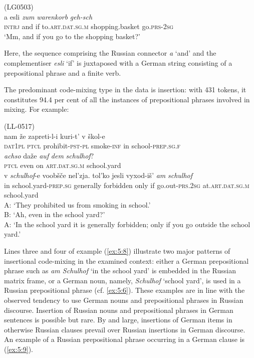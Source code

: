 \ea
\label{ex:5:7}
(LG0503)\\
 {a} {esli} \textit{zum} \textit{warenkorb} \textit{geh-sch} \\
	\textsc{intrj} and if {to.\textsc{art.dat.sg.m}} shopping.basket {go.\textsc{prs-2sg}} \\
\glt `Mm, and if you go to the shopping basket?'
\z

\noindent 
Here, the sequence comprising the Russian connector \textit{a} `and' and the complementiser \textit{esli} `if' is juxtaposed with a German string consisting of a prepositional phrase and a finite verb.

The predominant code-mixing type in the data is insertion: with 431 tokens, it constitutes 94.4 per cent of all the instances of prepositional phrases involved in mixing. For example:

\ea
\label{ex:5:8}
(LL-0517)\\
 {nam} {že} {zapreti-l-i} {kuri-t'} {v} {škol-e}\\
	{} \textsc{dat1pl} \textsc{ptcl} prohibit-\textsc{pst-pl} smoke-\textsc{inf} in  school-\textsc{prep.sg.f}\\
\glt 
{} \textit{achso} {daže} \textit{auf} \textit{dem} \textit{schulhof}?\\
	{} \textsc{ptcl} even on \textsc{art.dat.sg.m} school.yard\\
\glt 
{} {v} \textit{schulhof}{-e} {voobšče} {nel'zja}. {tol'ko} {jesli} {vyxod-iš'} \phantom{m} \textit{am} \textit{schulhof} \\
	{} {in} school.yard-\textsc{prep.sg} generally forbidden only if go.out\textsc{-prs.2sg}  {} at.\textsc{art.dat.sg.m} school.yard\\
\glt
A: `They prohibited us from smoking in school.'\\
B: `Ah, even in the school yard?'\\
A: `In the school yard it is generally forbidden; only if you go outside the \phantom{m} school yard.'
\z

\noindent 
Lines three and four of example (\ref{ex:5:8}) illustrate two major patterns of insertional code-mixing in the examined context: either a German prepositional phrase such as \textit{am Schulhof} `in the school yard' is embedded in the Russian matrix frame, or a German noun, namely, \textit{Schulhof} `school yard', is used in a Russian prepositional phrase (cf. \ref{ex:5:6}). These examples are in line with the observed tendency to use German nouns and prepositional phrases in Russian discourse. Insertion of Russian nouns and prepositional phrases in German sentences is possible but rare. By and large, insertions of German items in otherwise Russian clauses prevail over Russian insertions in German discourse. An example of a Russian prepositional phrase occurring in a German clause is (\ref{ex:5:9}). 

